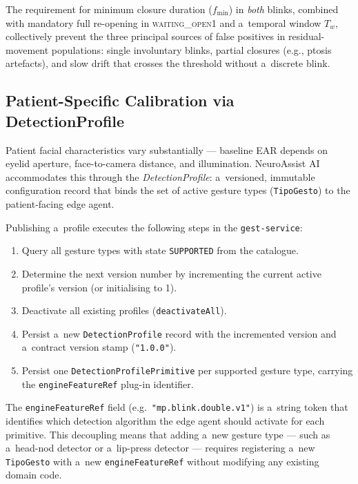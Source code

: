 The requirement for minimum closure duration ($f_\text{min}$) in \emph{both} blinks,
combined with mandatory full re-opening in \textsc{waiting\_open1} and a~temporal
window $T_w$, collectively prevent the three principal sources of false positives in
residual-movement populations: single involuntary blinks, partial closures (e.g., ptosis
artefacts), and slow drift that crosses the threshold without a~discrete blink.

\subsection{Patient-Specific Calibration via DetectionProfile}
\label{sec:calibration}

Patient facial characteristics vary substantially — baseline EAR depends on eyelid
aperture, face-to-camera distance, and illumination. NeuroAssist AI accommodates this
through the \emph{DetectionProfile}: a~versioned, immutable configuration record that
binds the set of active gesture types (\texttt{TipoGesto}) to the patient-facing edge
agent.

Publishing a~profile executes the following steps in the \texttt{gest-service}:
\begin{enumerate}
  \item Query all gesture types with state \texttt{SUPPORTED} from the catalogue.
  \item Determine the next version number by incrementing the current active profile's
    version (or initialising to 1).
  \item Deactivate all existing profiles (\texttt{deactivateAll}).
  \item Persist a~new \texttt{DetectionProfile} record with the incremented version and
    a~contract version stamp (\texttt{"1.0.0"}).
  \item Persist one \texttt{DetectionProfilePrimitive} per supported gesture type,
    carrying the \texttt{engineFeatureRef} plug-in identifier.
\end{enumerate}

The \texttt{engineFeatureRef} field (e.g.\ \texttt{"mp.blink.double.v1"}) is a~string
token that identifies which detection algorithm the edge agent should activate for each
primitive. This decoupling means that adding a~new gesture type — such as a~head-nod
detector or a~lip-press detector — requires registering a~new \texttt{TipoGesto} with
a~new \texttt{engineFeatureRef} without modifying any existing domain code.


